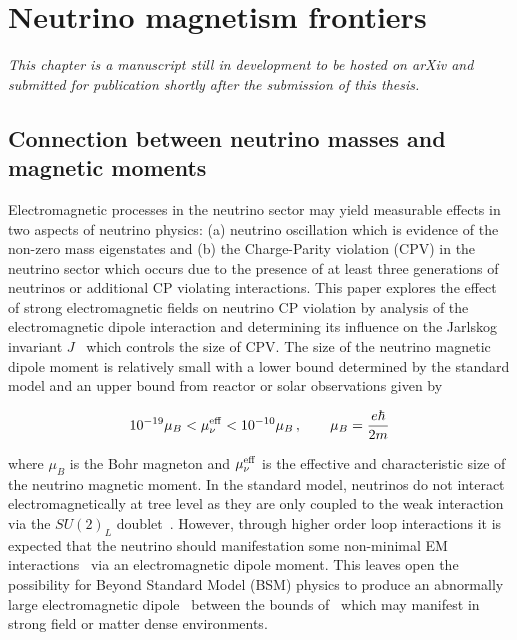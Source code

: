 \chapter{Neutrino magnetism frontiers}
\label{chap:neutrino}
\noindent \emph{This chapter is a manuscript still in development to be hosted on arXiv and submitted for publication shortly after the submission of this thesis.}\\



\section{Connection between neutrino masses and magnetic moments}\label{sec:flavor}
\noindent Electromagnetic processes in the neutrino sector may yield measurable effects in two aspects of neutrino physics: (a) neutrino oscillation which is evidence of the non-zero mass eigenstates and (b) the Charge-Parity violation (CPV) in the neutrino sector which occurs due to the presence of at least three generations of neutrinos or additional CP violating interactions. This paper explores the effect of strong electromagnetic fields on neutrino CP violation by analysis of the electromagnetic dipole interaction and determining its influence on the Jarlskog invariant $J$~\citep{jarlskog1985basis,jarlskog1985commutator,jarlskog2005invariants} which controls the size of CPV. The size of the neutrino magnetic dipole moment is relatively small with a lower bound determined by the standard model and an upper bound from reactor or solar observations given by~\citep{alexander2016status,canas2016updating,sierra2022neutrino}

\begin{align}
    \label{momentbound:1}
    10^{-19}\mu_{B}<\mu_{\nu}^{\rm eff}<10^{-10}\mu_{B}\,,\qquad\mu_{B}=\frac{e\hbar}{2m}
\end{align}

where $\mu_{B}$ is the Bohr magneton and $\mu_{\nu}^{\rm eff}$ is the effective and characteristic size of the neutrino magnetic moment. In the standard model, neutrinos do not interact electromagnetically at tree level as they are only coupled to the weak interaction via the $SU(2)_{L}$ doublet~\citep{Schwartz:2014sze}. However, through higher order loop interactions it is expected that the neutrino should manifestation some non-minimal EM interactions~\citep{shrock1980new,abi2021prospects} via an electromagnetic dipole moment. This leaves open the possibility for Beyond Standard Model (BSM) physics to produce an abnormally large electromagnetic dipole~\citep{giunti2015neutrino,lindner2017revisiting,brdar2021neutrino} between the bounds of~ which may manifest in strong field or matter dense environments.

